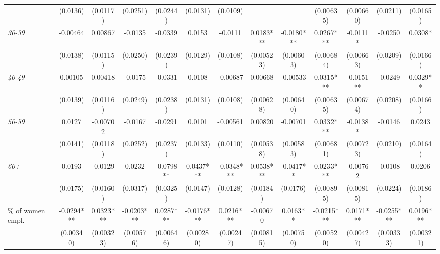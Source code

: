 {\begin{threeparttable}
\begin{tabular}{l*{12}{S}}
                                &       (0.0136)    & (0.0117)    & (0.0251)     & (0.0244)   & (0.0131)   & (0.0109)    &             &            & (0.00635)  & (0.00660)  & (0.0211)     & (0.0165)   \\[1ex]
\quad \textit{30-39}            &       -0.00464    & 0.00867     & -0.0135      & -0.0339    & 0.0153     & -0.0111     & 0.0183***   & -0.0180*** & 0.0267***  & -0.0111*   & -0.0250      & 0.0308*    \\
                                &       (0.0138)    & (0.0115)    & (0.0250)     & (0.0239)   & (0.0129)   & (0.0108)    & (0.00523)   & (0.00603)  & (0.00684)  & (0.00663)  & (0.0209)     & (0.0166)   \\[1ex]
\quad \textit{40-49}            &       0.00105     & 0.00418     & -0.0175      & -0.0331    & 0.0108     & -0.00687    & 0.00668     & -0.00533   & 0.0315***  & -0.0151**  & -0.0249      & 0.0329**   \\
                                &       (0.0139)    & (0.0116)    & (0.0249)     & (0.0238)   & (0.0131)   & (0.0108)    & (0.00628)   & (0.00640)  & (0.00635)  & (0.00674)  & (0.0208)     & (0.0166)   \\[1ex]
\quad \textit{50-59}            &       0.0127      & -0.00702    & -0.0167      & -0.0291    & 0.0101     & -0.00561    & 0.00820     & -0.00701   & 0.0332***  & -0.0138*   & -0.0146      & 0.0243     \\
                                &       (0.0141)    & (0.0118)    & (0.0252)     & (0.0237)   & (0.0133)   & (0.0110)    & (0.00538)   & (0.00583)  & (0.00681)  & (0.00723)  & (0.0210)     & (0.0164)   \\[1ex]
\quad \textit{60+}              &       0.0193      & -0.0129     & 0.0232       & -0.0798**  & 0.0437***  & -0.0348***  & 0.0538***   & -0.0417**  & 0.0233***  & -0.00762   & -0.0108      & 0.0206     \\
                                &       (0.0175)    & (0.0160)    & (0.0317)     & (0.0325)   & (0.0147)   & (0.0128)    & (0.0184)    & (0.0176)   & (0.00895)  & (0.00815)  & (0.0224)     & (0.0186)   \\[1ex]
\% of women empl.               &       -0.0294***  & 0.0323***   & -0.0203***   & 0.0287***  & -0.0176*** & 0.0216***   & -0.00670    & 0.0163**   & -0.0215*** & 0.0171***  & -0.0255***   & 0.0196***  \\
                                &       (0.00340)   & (0.00323)   & (0.00576)    & (0.00646)  & (0.00280)  & (0.00247)   & (0.00815)   & (0.00750)  & (0.00520)  & (0.00427)  & (0.00333)    & (0.00321)  \\[1ex]

\end{tabular}
\end{threeparttable}}
